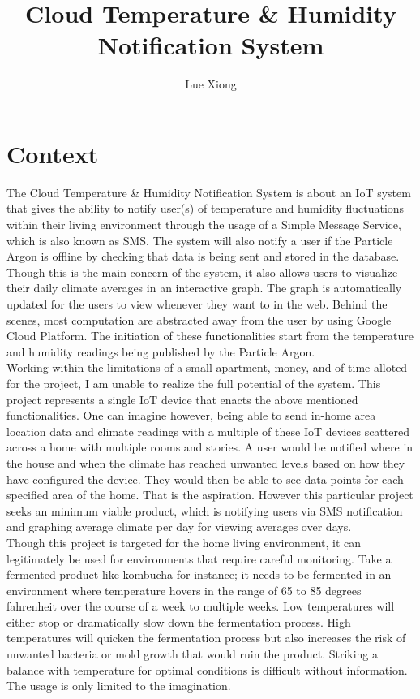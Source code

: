 \documentclass{article}
\title{Cloud Temperature \& Humidity Notification System}
\author{Lue Xiong}
\begin{document}
\maketitle
\newpage

\tableofcontents
\newpage

\obeylines

\section{Context}
The Cloud Temperature \& Humidity Notification System is about an IoT system that gives the ability to notify user(s) of temperature and humidity fluctuations within their living environment through the usage of a Simple Message Service, which is also known as SMS. The system will also notify a user if the Particle Argon is offline by checking that data is being sent and stored in the database. Though this is the main concern of the system, it also allows users to visualize their daily climate averages in an interactive graph. The graph is automatically updated for the users to view whenever they want to in the web. Behind the scenes, most computation are abstracted away from the user by using Google Cloud Platform. The initiation of these functionalities start from the temperature and humidity readings being published by the Particle Argon.\\

Working within the limitations of a small apartment, money, and of time alloted for the project, I am unable to realize the full potential of the system. This project represents a single IoT device that enacts the above mentioned functionalities. One can imagine however, being able to send in-home area location data and climate readings with a multiple of these IoT devices scattered across a home with multiple rooms and stories. A user would be notified where in the house and when the climate has reached unwanted levels based on how they have configured the device. They would then be able to see data points for each specified area of the home. That is the aspiration. However this particular project seeks an minimum viable product, which is notifying users via SMS notification and graphing average climate per day for viewing averages over days.\\

Though this project is targeted for the home living environment, it can legitimately be used for environments that require careful monitoring. Take a fermented product like kombucha for instance; it needs to be fermented in an environment where temperature hovers in the range of 65 to 85 degrees fahrenheit over the course of a week to multiple weeks. Low temperatures will either stop or dramatically slow down the fermentation process. High temperatures will quicken the fermentation process but also increases the risk of unwanted bacteria or mold growth that would ruin the product. Striking a balance with temperature for optimal conditions is difficult without information. The usage is only limited to the imagination.
\end{document}
